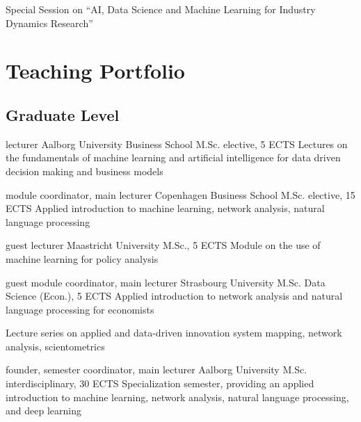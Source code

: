 \documentclass[10pt,a4paper,sans]{moderncv}   %
\begin{document}
{Special Session on \enquote{AI, Data Science and Machine Learning for Industry Dynamics Research}}




\newpage

\section{Teaching Portfolio}

\subsection{Graduate Level}

 {lecturer} {Aalborg University Business School} {M.Sc. elective, 5 ECTS}
{Lectures on the fundamentals of machine learning and artificial intelligence for data driven decision making and business models} 

 {module coordinator, main lecturer} {Copenhagen Business School} {M.Sc. elective, 15 ECTS}
{Applied introduction to machine learning, network analysis, natural language processing} 

 {guest lecturer} {Maastricht University} {M.Sc., 5 ECTS}
{Module on the use of machine learning for policy analysis} 

 {guest module coordinator, main lecturer} {Strasbourg University} {M.Sc. Data Science (Econ.), 5 ECTS}
{Applied introduction to network analysis and natural language processing for economists} 

{Lecture series on applied and data-driven innovation system mapping, network analysis, scientometrics}

 {founder, semester coordinator, main lecturer} {Aalborg University} {M.Sc. interdisciplinary, 30 ECTS}
{Specialization semester, providing an applied introduction to machine learning, network analysis, natural language processing, and deep learning} 
\end{document}
